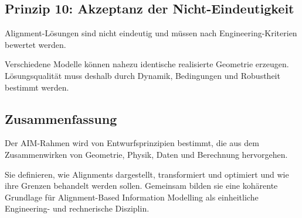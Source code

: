 \subsection{Prinzip 10: Akzeptanz der Nicht-Eindeutigkeit}
\begin{proposition}
Alignment-Lösungen sind nicht eindeutig und müssen nach Engineering-Kriterien
bewertet werden.
\end{proposition}
Verschiedene Modelle können nahezu identische realisierte Geometrie erzeugen.
Lösungsqualität muss deshalb durch Dynamik, Bedingungen und Robustheit
bestimmt werden.

\subsection{Zusammenfassung}
\begin{summary}
Der AIM-Rahmen wird von Entwurfsprinzipien bestimmt, die aus dem
Zusammenwirken von Geometrie, Physik, Daten und Berechnung hervorgehen.

Sie definieren, wie Alignments dargestellt, transformiert und optimiert und
wie ihre Grenzen behandelt werden sollen. Gemeinsam bilden sie eine kohärente
Grundlage für Alignment-Based Information Modelling als einheitliche
Engineering- und rechnerische Disziplin.
\end{summary}
